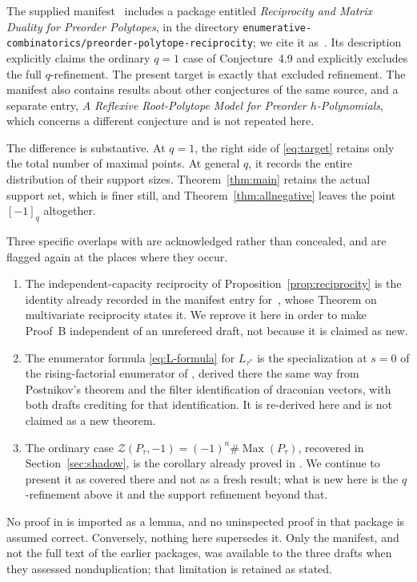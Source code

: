 \documentclass[11pt]{article}
\numberwithin{equation}{section}
\theoremstyle{definition}
\theoremstyle{remark}
\newcommand{\Max}{\operatorname{Max}}
\newcommand{\qint}[1]{[#1]_q}
\newcommand{\Zeta}{\mathcal Z}
\begin{document}
The supplied manifest~\cite{Manifest} includes a package entitled
\emph{Reciprocity and Matrix Duality for Preorder Polytopes}, in the directory
\nolinkurl{enumerative-combinatorics/preorder-polytope-reciprocity}; we cite
it as~\cite{PriorReciprocity}. Its description explicitly claims the ordinary
$q=1$ case of Conjecture~4.9 and explicitly excludes the full
$q$-refinement. The present target is exactly that excluded refinement. The
manifest also contains results about other conjectures of the same source, and
a separate entry, \emph{A Reflexive Root-Polytope Model for Preorder
$h$-Polynomials}, which concerns a different conjecture and is not repeated
here.

The difference is substantive. At $q=1$, the right side of \eqref{eq:target}
retains only the total number of maximal points. At general $q$, it records
the entire distribution of their support sizes. Theorem~\ref{thm:main} retains
the actual support set, which is finer still, and
Theorem~\ref{thm:allnegative} leaves the point $\qint{-1}$ altogether.

Three specific overlaps with \cite{PriorReciprocity} are acknowledged rather
than concealed, and are flagged again at the places where they occur.
\begin{enumerate}[label=(\roman*)]
\item The independent-capacity reciprocity of
 Proposition~\ref{prop:reciprocity} is the identity already recorded in the
 manifest entry for~\cite{PriorReciprocity}, whose Theorem on multivariate
 reciprocity states it. We reprove it here in order to make Proof~B
 independent of an unrefereed draft, not because it is claimed as new.
\item The enumerator formula \eqref{eq:L-formula} for $L_{\tau^*}$ is the
 specialization at $s=0$ of the rising-factorial enumerator of
 \cite{PriorReciprocity}, derived there the same way from Postnikov's theorem
 and the filter identification of draconian vectors, with both drafts
 crediting \cite[Lemma~4.1]{AC} for that identification. It is re-derived here
 and is not claimed as a new theorem.
\item The ordinary case $\Zeta(P_\tau,-1)=(-1)^n\#\Max(P_\tau)$, recovered in
 Section~\ref{sec:shadow}, is the corollary already proved in
 \cite{PriorReciprocity}. We continue to present it as covered there and not
 as a fresh result; what is new here is the $q$-refinement above it and the
 support refinement beyond that.
\end{enumerate}
No proof in \cite{PriorReciprocity} is imported as a lemma, and no uninspected
proof in that package is assumed correct. Conversely, nothing here supersedes
it. Only the manifest, and not the full text of the earlier packages, was
available to the three drafts when they assessed nonduplication; that
limitation is retained as stated.
\end{document}
